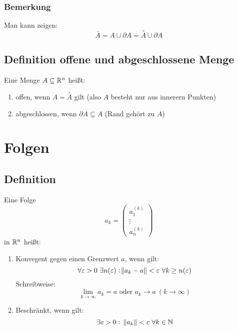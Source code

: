 \subsubsection{Bemerkung}
Man kann zeigen:
\begin{equation*}
    \bar{A} = A \cup \partial A =  \overset{\circ}{A} \cup \partial A
\end{equation*}

\subsection{Definition offene und abgeschlossene Menge}
Eine Menge $A \subseteq \mathbb{R}^n$ heißt:
\begin{enumerate}[label= (\alph*)]
    \item offen, wenn $A = \overset{\circ}{A}$ gilt (also $A$ besteht nur aus
        innerern Punkten)
    \item abgeschlossen, wenn $\partial A \subseteq A$ (Rand gehört zu $A$)
\end{enumerate}

\section{Folgen}
\subsection{Definition}
Eine Folge
\begin{equation*}
    a_k =
    \begin{pmatrix}
        a_1^{(k)} \\
        \vdots \\
        a_n^{(k)}
    \end{pmatrix}
\end{equation*}
in $\mathbb{R}^n$ heißt:
\begin{enumerate}[label= (\alph*)]
    \item Konvegent gegen einen Grenzwert $a$, wenn gilt:
        \begin{equation*}
            \forall \varepsilon > 0\ \exists n(\varepsilon): \norm{a_k - a}<\varepsilon
            \ \forall k \geq n(\varepsilon)
        \end{equation*}
        Schreibweise:
        \begin{equation*}
            \lim_{k \rightarrow \infty} a_k = a \text{ oder }
            a_k \rightarrow a\ (k \rightarrow \infty)
        \end{equation*}
    \item Beschränkt, wenn gilt:
        \begin{equation*}
            \exists c > 0:\ \norm{a_k} < c\ \forall k \in \mathbb{N}
        \end{equation*}
\end{enumerate}

